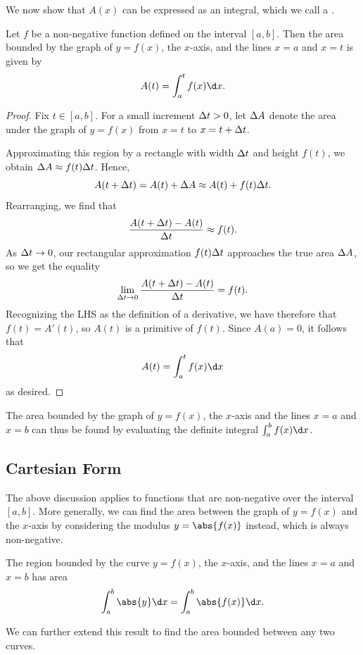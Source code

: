 We now show that $A(x)$ can be expressed as an integral, which we call a .

\begin{proposition}
    Let $f$ be a non-negative function defined on the interval $[a, b]$. Then the area bounded by the graph of $y = f(x)$, the $x$-axis, and the lines $x = a$ and $x = t$ is given by \[A(t) = \int_a^t f(x) \d x.\]
\end{proposition}
\begin{proof}
    Fix $t \in [a, b]$. For a small increment $\Delta t > 0$, let $\Delta A$ denote the area under the graph of $y = f(x)$ from $x = t$ to $x = t + \Delta t$.
    
    Approximating this region by a rectangle with width $\Delta t$ and height $f(t)$, we obtain $\Delta A \approx f(t) \Delta t$. Hence, \[A(t + \Delta t) = A(t) + \Delta A \approx A(t) + f(t) \Delta t.\] Rearranging, we find that \[\frac{A(t + \Delta t) - A(t)}{\Delta t} \approx f(t).\] As $\Delta t \to 0$, our rectangular approximation $f(t) \Delta t$ approaches the true area $\Delta A$, so we get the equality \[\lim_{\Delta t \to 0} \frac{A(t + \Delta t) - A(t)}{\Delta t} = f(t).\] Recognizing the LHS as the definition of a derivative, we have therefore that $f(t) = A'(t)$, so $A(t)$ is a primitive of $f(t)$. Since $A(a) = 0$, it follows that \[A(t) = \int_a^t f(x) \d x\] as desired.
\end{proof}

The area bounded by the graph of $y = f(x)$, the $x$-axis and the lines $x = a$ and $x = b$ can thus be found by evaluating the definite integral $\int_a^b f(x) \d x$.

\subsection{Cartesian Form}

The above discussion applies to functions that are non-negative over the interval $[a, b]$. More generally, we can find the area between the graph of $y = f(x)$ and the $x$-axis by considering the modulus $y = \abs{f(x)}$ instead, which is always non-negative.

\begin{proposition}
    The region bounded by the curve $y = f(x)$, the $x$-axis, and the lines $x = a$ and $x = b$ has area \[\int_a^b \abs{y} \d x = \int_a^b \abs{f(x)} \d x.\]
\end{proposition}

We can further extend this result to find the area bounded between any two curves.

